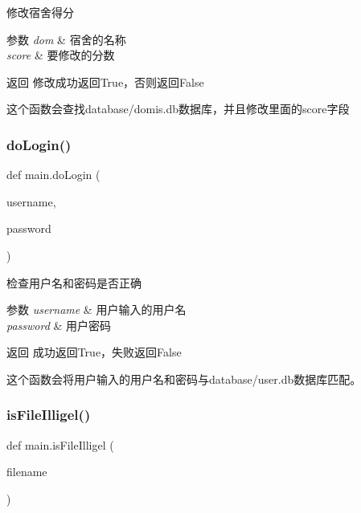 修改宿舍得分 


\begin{DoxyParams}{参数}
{\em dom} & 宿舍的名称 \\
\hline
{\em score} & 要修改的分数 \\
\hline
\end{DoxyParams}
\begin{DoxyReturn}{返回}
修改成功返回\+True，否则返回\+False
\end{DoxyReturn}
这个函数会查找database/domis.db数据库，并且修改里面的score字段 \mbox{\label{namespacemain_ac89e4341171325314c0685e7f49d8015}} 
\subsubsection{\texorpdfstring{doLogin()}{doLogin()}}
{\footnotesize\ttfamily def main.\+do\+Login (\begin{DoxyParamCaption}\item[{}]{username,  }\item[{}]{password }\end{DoxyParamCaption})}



检查用户名和密码是否正确 


\begin{DoxyParams}{参数}
{\em username} & 用户输入的用户名 \\
\hline
{\em password} & 用户密码 \\
\hline
\end{DoxyParams}
\begin{DoxyReturn}{返回}
成功返回\+True，失败返回\+False
\end{DoxyReturn}
这个函数会将用户输入的用户名和密码与database/user.db数据库匹配。 \mbox{\label{namespacemain_ab4bfdca65955984f28c72a5d0daec565}} 
\subsubsection{\texorpdfstring{isFileIlligel()}{isFileIlligel()}}
{\footnotesize\ttfamily def main.\+is\+File\+Illigel (\begin{DoxyParamCaption}\item[{}]{filename }\end{DoxyParamCaption})}



